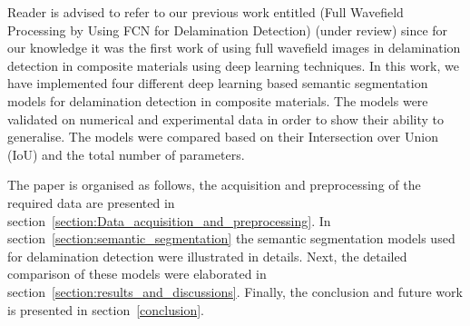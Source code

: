 Reader is advised to refer to our previous work entitled (Full Wavefield Processing by Using FCN for Delamination Detection) (under review) since for our knowledge it was the first work of using full wavefield images in delamination detection in composite materials using deep learning techniques. 
In this work, we have implemented four different deep learning based semantic segmentation models for delamination detection in composite materials.
The models were validated on numerical and experimental data in order to show their ability to generalise.
The models were compared based on their Intersection over Union (IoU) and the total number of parameters.

The paper is organised as follows, the acquisition and preprocessing of the required data are presented in section~\ref{section:Data_acquisition_and_preprocessing}.
In section~\ref{section:semantic_segmentation} the semantic segmentation models used for delamination detection were illustrated in details. 
Next, the detailed comparison of these models were elaborated in section~\ref{section:results_and_discussions}.
Finally, the conclusion and future work is presented in section~\ref{conclusion}.